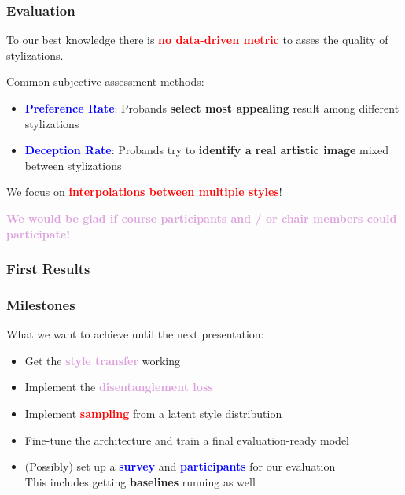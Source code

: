\documentclass[11pt,xcolor=dvipsnames]{beamer}
\begin{document}
\begin{frame}
\frametitle{Evaluation}

To our best knowledge there is \textcolor{red}{\textbf{no data-driven metric}} to asses the quality of stylizations.

\vspace{10pt}

Common subjective assessment methods:

\begin{itemize}
	\item \textcolor{blue}{\textbf{Preference Rate}}: Probands \textbf{select most appealing} result among different stylizations
	\item \textcolor{blue}{\textbf{Deception Rate}}: Probands try to \textbf{identify a real artistic image} mixed between stylizations
\end{itemize}

\vspace{10pt}

We focus on \textbf{\textcolor{red}{interpolations between multiple styles}}!

\vspace{10pt}

\textcolor{Plum}{\textbf{We would be glad if course participants and / or chair members could participate!}}


\end{frame}

\begin{frame}
\frametitle{First Results}



\end{frame}

\begin{frame}
\frametitle{Milestones}

What we want to achieve until the next presentation:
	\vspace{10pt}
\begin{itemize}
	\item Get the \textcolor{Plum}{\textbf{style transfer}} working
	\vspace{10pt}
	\item Implement the \textcolor{Plum}{\textbf{disentanglement loss}}
	\vspace{10pt}
	\item Implement \textcolor{red}{\textbf{sampling}} from a latent style distribution
	\vspace{10pt}
	\item Fine-tune the architecture and train a final evaluation-ready model
	\vspace{10pt}
	\item (Possibly) set up a \textcolor{blue}{\textbf{survey}} and \textcolor{blue}{\textbf{participants}} for our evaluation
	\\
	This includes getting \textbf{baselines} running as well
\end{itemize}
\end{frame}
\end{document}
